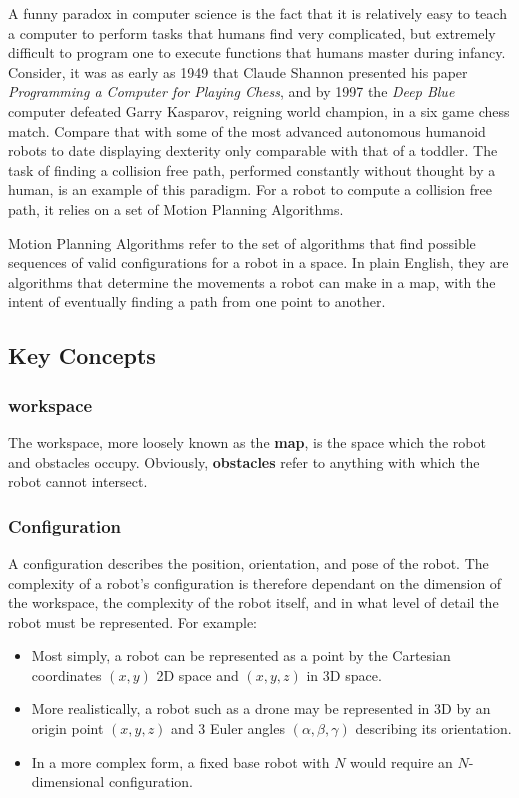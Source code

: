 
A funny paradox in computer science is the fact that it is relatively easy to teach a computer to perform tasks that humans find very complicated, but extremely difficult to program one to execute functions that humans master during infancy. Consider, it was as early as 1949 that Claude Shannon presented his paper \textit{Programming a Computer for Playing Chess}\cite{Shannon1950}, and by 1997 the \textit{Deep Blue} computer defeated Garry Kasparov, reigning world champion, in a six game chess match.\cite{Campbell2002} Compare that with some of the most advanced autonomous humanoid robots to date displaying dexterity only comparable with that of a toddler. The task of finding a collision free path, performed constantly without thought by a human, is an example of this paradigm. For a robot to compute a collision free path, it relies on a set of Motion Planning Algorithms.

Motion Planning Algorithms refer to the set of algorithms that find possible sequences of valid \gls{configuration}s for a robot in a space. In plain English, they are algorithms that determine the movements a robot can make in a map, with the intent of eventually finding a path from one point to another. 

\subsection{Key Concepts}
    \subsubsection{\Gls{workspace}}
    The \gls{workspace}, more loosely known as the \textbf{map}, is the space which the robot and obstacles occupy. Obviously, \textbf{obstacles} refer to anything with which the robot cannot intersect.
    
    \subsubsection{Configuration}
    A configuration describes the position, orientation, and pose of the robot. The complexity of a robot's configuration is therefore dependant on the dimension of the \gls{workspace}, the complexity of the robot itself, and in what level of detail the robot must be represented. For example:
    \begin{itemize}
        \item Most simply, a robot can be represented as a point by the Cartesian coordinates $(x,y)$ \gls{2D} space and $(x,y,z)$ in \gls{3D} space.
        \item More realistically, a robot such as a drone may be represented in \gls{3D} by an origin point $(x,y,z)$ and 3 Euler angles $(\alpha,\beta,\gamma)$ describing its orientation.
        \item In a more complex form, a fixed base robot with $N$  would require an $N$-dimensional configuration.
    \end{itemize}


